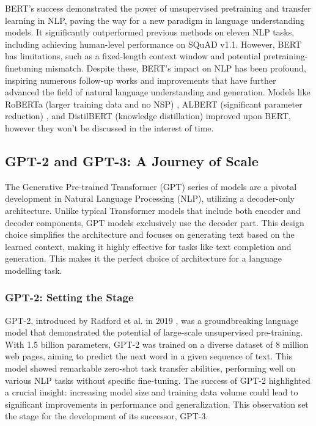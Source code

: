 \documentclass[a4paper, oneside]{discothesis}
\begin{document}
BERT's success demonstrated the power of unsupervised pretraining and transfer learning in NLP, paving the way for a new paradigm in language understanding models. 
It significantly outperformed previous methods on eleven NLP tasks, including achieving human-level performance on SQuAD v1.1. 
However, BERT has limitations, such as a fixed-length context window and potential pretraining-finetuning mismatch. 
Despite these, BERT's impact on NLP has been profound, inspiring numerous follow-up works and improvements that have further advanced the field of natural language understanding and generation.
Models like RoBERTa (larger training data and no NSP) \cite{liu2019roberta}, ALBERT (significant parameter reduction) \cite{lan2019albert}, and DistilBERT (knowledge distillation) \cite{sanh2019distilbert} improved upon BERT, however they won't be discussed in the interest of time. 

\subsection{GPT-2 and GPT-3: A Journey of Scale}
The Generative Pre-trained Transformer (GPT) series of models are a pivotal development in Natural Language Processing (NLP), utilizing a decoder-only architecture. 
Unlike typical Transformer models that include both encoder and decoder components, GPT models exclusively use the decoder part. 
This design choice simplifies the architecture and focuses on generating text based on the learned context, making it highly effective for tasks like text completion and generation.
This makes it the perfect choice of architecture for a language modelling task.

\subsubsection{GPT-2: Setting the Stage}
GPT-2, introduced by Radford et al. in 2019 \cite{radford2019language}, was a groundbreaking language model that demonstrated the potential of large-scale unsupervised pre-training. 
With 1.5 billion parameters, GPT-2 was trained on a diverse dataset of 8 million web pages, aiming to predict the next word in a given sequence of text. 
This model showed remarkable zero-shot task transfer abilities, performing well on various NLP tasks without specific fine-tuning.
The success of GPT-2 highlighted a crucial insight: increasing model size and training data volume could lead to significant improvements in performance and generalization. 
This observation set the stage for the development of its successor, GPT-3.
\end{document}
